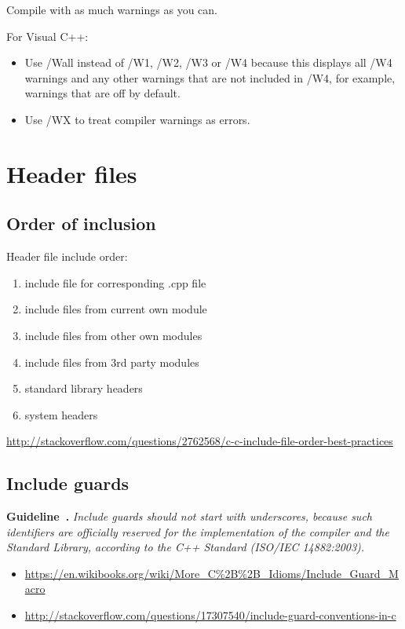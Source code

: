 \documentclass{article}
\newcounter{guideline}
\newenvironment{guideline}[1][]{\refstepcounter{guideline}\par\medskip
   \noindent \textbf{Guideline~\theguideline. #1} \em \rmfamily}{\medskip}
\begin{document}
Compile with as much warnings as you can.

For Visual C++:
\begin{itemize}
	\item Use /Wall instead of /W1, /W2, /W3 or /W4 because this displays all /W4 warnings and any other warnings that are not included in /W4, for example, warnings that are off by default.
	\item Use /WX to treat compiler warnings as errors.
\end{itemize}

\section{Header files}

\subsection{Order of inclusion}
Header file include order:
\begin{enumerate}
\item include file for corresponding .cpp file
\item include files from current own module
\item include files from other own modules
\item include files from 3rd party modules
\item standard library headers
\item system headers
\end{enumerate}
\url{http://stackoverflow.com/questions/2762568/c-c-include-file-order-best-practices}

\subsection{Include guards}

\begin{guideline}
Include guards should not start with underscores, because such identifiers are officially reserved for the implementation of the compiler and the Standard Library, according to the C++ Standard (ISO/IEC 14882:2003).
\end{guideline}
\begin{itemize}
\item \url{https://en.wikibooks.org/wiki/More_C%2B%2B_Idioms/Include_Guard_Macro}
\item \url{http://stackoverflow.com/questions/17307540/include-guard-conventions-in-c}
\end{itemize}
\end{document}
